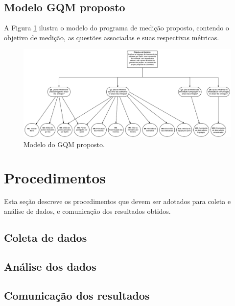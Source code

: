       \vfill
      \pagebreak
      \subsection{Modelo GQM proposto}
      
	A Figura \ref{gqm_proposto} ilustra o modelo do programa de medição proposto, contendo o objetivo de medição, as 
	questões associadas e suas respectivas métricas.
	
	\begin{figure}[!htb]
	  \centering
	  \includegraphics[scale=0.27, angle=90]{figuras/GQM}
	  \caption[Modelo do GQM proposto.]{Modelo do GQM proposto.}
	  \label{gqm_proposto}
	\end{figure}
      
    \section{Procedimentos}
      
      Esta seção descreve os procedimentos que devem ser adotados para coleta e análise de dados, e comunicação dos resultados obtidos.
      
      \subsection{Coleta de dados}
      
      \subsection{Análise dos dados}
      
      \subsection{Comunicação dos resultados}